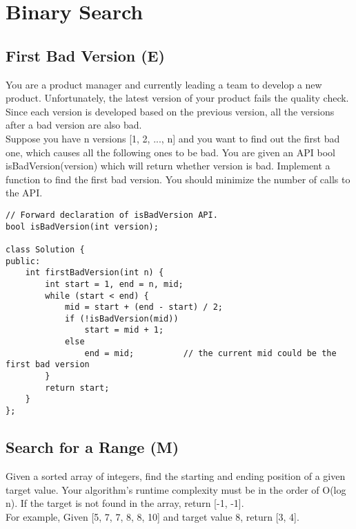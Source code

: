 \chapter{Binary Search}
\section{First Bad Version (E)}
You are a product manager and currently leading a team to develop a new product. Unfortunately, the latest version of your product fails the quality check. Since each version is developed based on the previous version, all the versions after a bad version are also bad.\\

Suppose you have n versions [1, 2, ..., n] and you want to find out the first bad one, which causes all the following ones to be bad. You are given an API bool isBadVersion(version) which will return whether version is bad. Implement a function to find the first bad version. You should minimize the number of calls to the API. \\

\begin{lstlisting}
// Forward declaration of isBadVersion API.
bool isBadVersion(int version);

class Solution {
public:
    int firstBadVersion(int n) {
        int start = 1, end = n, mid;
        while (start < end) {
            mid = start + (end - start) / 2;
            if (!isBadVersion(mid))
                start = mid + 1;
            else
                end = mid;          // the current mid could be the first bad version
        }
        return start;
    }
};
\end{lstlisting}


\section{Search for a Range (M)}
Given a sorted array of integers, find the starting and ending position of a given target value. Your algorithm's runtime complexity must be in the order of O(log n). If the target is not found in the array, return [-1, -1].\\

For example,
Given [5, 7, 7, 8, 8, 10] and target value 8,
return [3, 4]. \\

